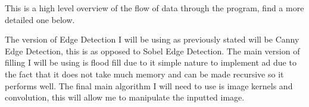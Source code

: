 \begin{FlushLeft}
    \begin{figure}[H]
        \centering
    \end{figure}

    This is a high level overview of the flow of data through the program, find a more detailed one below.\\ \bk

    The version of Edge Detection I will be using as previously stated will be Canny Edge Detection, this is as opposed to Sobel Edge Detection. The main version of filling I will be using is flood fill due to it simple nature to implement ad due to the fact that it does not take much memory and can be made recursive so it performs well. The final main algorithm I will need to use is image kernels and convolution, this will allow me to manipulate the inputted image.


\end{FlushLeft}
